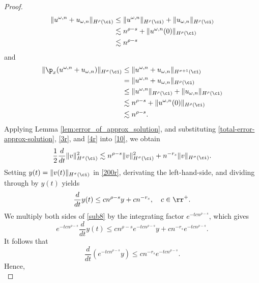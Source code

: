 \begin{proof}
\begin{equation}
\begin{split}
		 \|u^{\omega,n} + u_{\omega,n} \|_{H^\rho(\ci)}
		 & \le
		\|u^{\omega,n}\|_{H^\rho(\ci)} + \|u_{\omega,n}\|_{H^\rho(\ci)}
		\\
		& \lesssim n^{\rho -s} + \|u^{\omega,n}(0)\|_{H^\rho(\ci)}
		\\
		& \lesssim n^{\rho -s}
		\label{3r}
	\end{split}
\end{equation}
and
\begin{equation}
	\begin{split}
		\|\p_x(u^{\omega,n} + u_{\omega,n}) \|_{H^\sigma(\ci)} 
		& \le \|u^{\omega,n} + u_{\omega,n}\|_{H^{\sigma + 1}(\ci)}
		\\
		& = \|u^{\omega,n} + u_{\omega,n}\|_{H^{\rho}(\ci)}
		\\
		& \le \|u^{\omega,n} \|_{H^{\rho}(\ci)} + \|u_{\omega,n}
		\|_{H^{\rho}(\ci)}
		\\
		& \lesssim n^{\rho -s} + \|u^{\omega,n}(0)\|_{H^{\rho}(\ci)}
		\\
		& \lesssim n^{\rho -s}.
		\label{4r}
	\end{split}
\end{equation}
Applying Lemma \ref{lem:error_of_approx_solution}, and
substituting \eqref{total-error-approx-solution}, \eqref{3r},
and \eqref{4r} into \eqref{10}, we obtain
\begin{equation}
	\begin{split}
		\frac{1}{2}\frac{d}{dt}\|v\|_{H^\sigma(\ci)}^2 \lesssim n^{\rho - s}
		\|v\|_{H^\sigma(\ci)}^2 + n^{-r_s}\|v\|_{H^\sigma(\ci)}.
		\label{200r}
	\end{split}
\end{equation}
Setting $y(t) = \|v(t)\|_{H^\sigma(\ci)}$  in \eqref{200r}, derivating the
left-hand-side, and dividing through by $y(t)$ yields
\begin{equation}
	\label{sub8}
	\frac{d}{dt} y(t) \le cn^{\rho - s}y + cn^{-r_s}, \quad c\in \rr^{+}.
\end{equation}
We multiply both sides of \eqref{sub8} by the integrating factor $e^{-tcn^{\rho - s}}$,
which gives
\begin{equation*}
	e^{-tcn^{\rho - s}}\frac{d}{dt} y(t) \le cn^{\rho - s} e^{-tcn^{\rho - s}}y
	+ cn^{-r_s}e^{-tcn^{\rho - s}}.
\end{equation*}
It follows that
\begin{equation*}
	\frac{d}{dt}\left (e^{-tcn^{\rho - s}} y \right ) \le cn^{-r_s}e^{-tcn^{\rho - s}} .
\end{equation*}
Hence,
\begin{equation*}

\end{equation*}
\end{proof}
